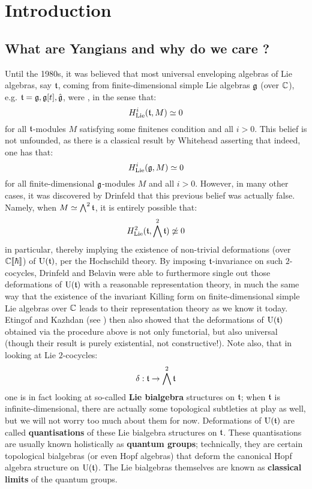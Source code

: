 \section{Introduction}
    \subsection{What are Yangians and why do we care ?}
        Until the 1980s, it was believed that most universal enveloping algebras of Lie algebras, say $\mathfrak{t}$, coming from finite-dimensional simple Lie algebras $\mathfrak{g}$ (over $\mathbb{C}$), e.g. $\mathfrak{t} = \mathfrak{g}, \mathfrak{g}[t], \hat{\mathfrak{g}}$, were , in the sense that:
            $$H^i_{\mathrm{Lie}}(\mathfrak{t}, M) \simeq 0$$
        for all $\mathfrak{t}$-modules $M$ satisfying some finitenes condition and all $i > 0$. This belief is not unfounded, as there is a classical result by Whitehead asserting that indeed, one has that:
            $$H^i_{\mathrm{Lie}}(\mathfrak{g}, M) \simeq 0$$    
        for all finite-dimensional $\mathfrak{g}$-modules $M$ and all $i > 0$. However, in many other cases, it was discovered by Drinfeld that this previous belief was actually false. Namely, when $M \simeq \bigwedge^2 \mathfrak{t}$, it is entirely possible that:
            $$H^2_{\mathrm{Lie}}(\mathfrak{t}, \bigwedge^2 \mathfrak{t}) \not \simeq 0$$
        in particular, thereby implying the existence of non-trivial deformations (over $\mathbb{C}[\![\hbar]\!]$) of $\mathrm{U}(\mathfrak{t})$, per the Hochschild theory. By imposing $\mathfrak{t}$-invariance on such $2$-cocycles, Drinfeld and Belavin were able to furthermore single out those deformations of $\mathrm{U}(\mathfrak{t})$ with a reasonable representation theory, in much the same way that the existence of the invariant Killing form on finite-dimensional simple Lie algebras over $\mathbb{C}$ leads to their representation theory as we know it today. Etingof and Kazhdan (see \cite{etingof_kazhdan_quantisation_1}) then also showed that the deformations of $\mathrm{U}(\mathfrak{t})$ obtained via the procedure above is not only functorial, but also universal (though their result is purely existential, not constructive!). Note also, that in looking at  Lie $2$-cocycles:
            $$\delta: \mathfrak{t} \to \bigwedge^2 \mathfrak{t}$$
        one is in fact looking at so-called \textbf{Lie bialgebra} structures on $\mathfrak{t}$; when $\mathfrak{t}$ is infinite-dimensional, there are actually some topological subtleties at play as well, but we will not worry too much about them for now. Deformations of $\mathrm{U}(\mathfrak{t})$ are called \textbf{quantisations} of these Lie bialgebra structures on $\mathfrak{t}$. These quantisations are usually known holistically as \textbf{quantum groups}; technically, they are certain topological bialgebras (or even Hopf algebras) that deform the canonical Hopf algebra structure on $\mathrm{U}(\mathfrak{t})$. The Lie bialgebras themselves are known as \textbf{classical limits} of the quantum groups.
    
